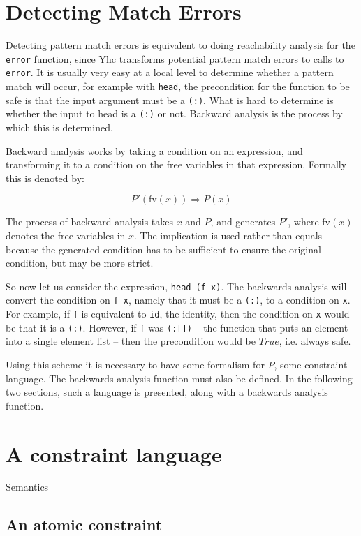 \documentclass[preprint]{sigplanconf}
\newcommand{\T}[1]{\texttt{#1}}
\begin{document}
\section{Detecting Match Errors}

Detecting pattern match errors is equivalent to doing reachability analysis for
the \T{error} function, since Yhc transforms potential pattern match errors to
calls to \T{error}. It is usually very easy at a local level to determine
whether a pattern match will occur, for example with \T{head}, the precondition
for the function to be safe is that the input argument must be a \T{(:)}. What
is hard to determine is whether the input to head is a \T{(:)} or not. Backward
analysis is the process by which this is determined.

Backward analysis works by taking a condition on an expression, and
transforming it to a condition on the free variables in that expression.
Formally this is denoted by:

\[ P'(\text{fv}(x)) \Rightarrow P(x) \]

The process of backward analysis takes $x$ and $P$, and generates $P'$, where
$\text{fv}(x)$ denotes the free variables in $x$. The implication is used
rather than equals because the generated condition has to be sufficient to
ensure the original condition, but may be more strict.

So now let us consider the expression, \T{head (f x)}. The backwards analysis
will convert the condition on \T{f x}, namely that it must be a \T{(:)}, to a
condition on \T{x}. For example, if \T{f} is equivalent to \T{id}, the
identity, then the condition on \T{x} would be that it is a \T{(:)}. However,
if \T{f} was \T{(:[])} -- the function that puts an element into a single
element list -- then the precondition would be $True$, i.e. always safe.

Using this scheme it is necessary to have some formalism for $P$, some
constraint language. The backwards analysis function must also be defined. In
the following two sections, such a language is presented, along with a
backwards analysis function.


\section{A constraint language}
\label{chap:constraints}

Semantics

\subsection{An atomic constraint}
\end{document}
